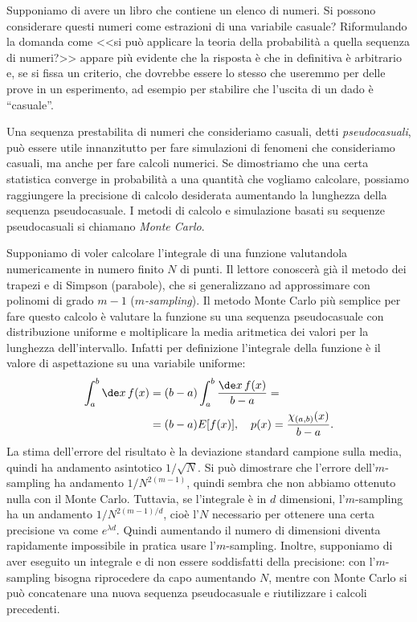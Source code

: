 
Supponiamo di avere un libro che contiene un elenco di numeri.
Si possono considerare questi numeri come estrazioni di una variabile casuale?
Riformulando la domanda come
<<si può applicare la teoria della probabilità a quella sequenza di numeri?>>
appare più evidente che la risposta è che in definitiva è arbitrario e,
se si fissa un criterio,
che dovrebbe essere lo stesso che useremmo per delle prove in un esperimento,
ad esempio per stabilire che l'uscita di un dado è ``casuale''.

Una sequenza prestabilita di numeri che consideriamo casuali,
detti \emph{pseudocasuali},
può essere utile innanzitutto per fare simulazioni di fenomeni che consideriamo casuali,
ma anche per fare calcoli numerici.
Se dimostriamo che una certa statistica converge in probabilità a una quantità che vogliamo calcolare,
possiamo raggiungere la precisione di calcolo desiderata aumentando la lunghezza della sequenza pseudocasuale.
I metodi di calcolo e simulazione basati su sequenze pseudocasuali si chiamano \emph{Monte Carlo}.

Supponiamo di voler calcolare l'integrale di una funzione valutandola numericamente in numero finito $N$ di punti.
Il lettore conoscerà già il metodo dei trapezi e di Simpson (parabole),
che si generalizzano ad approssimare con polinomi di grado $m-1$ (\emph{$m$-sampling}).
Il metodo Monte Carlo più semplice per fare questo calcolo
è valutare la funzione su una sequenza pseudocasuale con distribuzione uniforme
e moltiplicare la media aritmetica dei valori per la lunghezza dell'intervallo.
Infatti per definizione l'integrale della funzione è il valore di aspettazione su una variabile uniforme:
\begin{align*}
	\int_a^b \de x\,f(x)
	&= (b-a)\int_a^b \frac{\de x\,f(x)}{b-a} = \\
	&= (b-a) E[f(x)], \quad p(x) = \frac{\chi_{(a,b)}(x)}{b-a}.
\end{align*}
La stima dell'errore del risultato è la deviazione standard campione sulla media,
quindi ha andamento asintotico $1/\sqrt N$.
Si può dimostrare che l'errore dell'$m$-sampling ha andamento $1/N^{2(m-1)}$,
quindi sembra che non abbiamo ottenuto nulla con il Monte Carlo.
Tuttavia, se l'integrale è in $d$ dimensioni, l'$m$-sampling ha un andamento $1/N^{2(m-1)/d}$,
cioè l'$N$ necessario per ottenere una certa precisione va come $e^{\lambda d}$.
Quindi aumentando il numero di dimensioni diventa rapidamente impossibile in pratica usare l'$m$-sampling.
Inoltre, supponiamo di aver eseguito un integrale e di non essere soddisfatti della precisione:
con l'$m$-sampling bisogna riprocedere da capo aumentando $N$,
mentre con Monte Carlo si può concatenare una nuova sequenza pseudocasuale e riutilizzare i calcoli precedenti.

